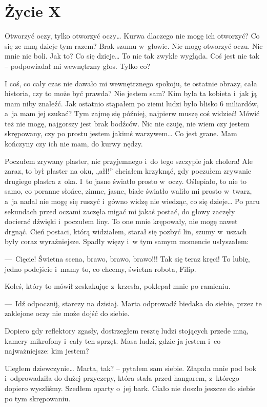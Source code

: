 \chapter{Życie X}

Otworzyć oczy, tylko otworzyć oczy… Kurwa dlaczego nie mogę ich otworzyć? Co się ze mną dzieje tym razem? Brak szumu w~głowie. Nie mogę otworzyć oczu. Nic mnie nie boli. Jak to? Co się dzieje… To nie tak zwykle wygląda. Coś jest nie tak – podpowiadał mi wewnętrzny głos. Tylko co?

I coś, co cały czas nie dawało mi wewnętrznego spokoju, te ostatnie obrazy, cała historia, czy to może być prawda? Nie jestem sam? Kim była ta kobieta i~jak ją mam niby znaleźć. Jak ostatnio stąpałem po ziemi ludzi było blisko 6 miliardów, a~ja mam jej szukać? Tym zajmę się później, najpierw muszę coś widzieć! Mówić też nie mogę, najgorszy jest brak bodźców. Nic nie czuję, nie wiem czy jestem skrępowany, czy po prostu jestem jakimś warzywem… Co jest grane. Mam kończyny czy ich nie mam, do kurwy nędzy.

Poczułem zrywany plaster, nic przyjemnego i~do tego szczypie jak cholera! Ale zaraz, to był plaster na oku, „ałł!” chciałem krzyknąć, gdy poczułem zrywanie drugiego plastra z~oka. I~to jasne światło prosto w~oczy. Oślepiało, to nie to samo, co poranne słońce, zimne, jasne, białe światło waliło mi prosto w~twarz, a~ja nadal nie mogę się ruszyć i~gówno widzę nie wiedząc, co się dzieje… Po paru sekundach przed oczami zaczęła migać mi jakaś postać, do głowy zaczęły docierać dźwięki i~poczułem liny. To one mnie krępowały, nie mogę nawet drgnąć. Cień postaci, którą widziałem, starał się pozbyć lin, szumy w~uszach były coraz wyraźniejsze. Spadły więzy i~w tym samym momencie usłyszałem:

---~Cięcie! Świetna scena, brawo, brawo, brawo!!! Tak się teraz kręci! To lubię, jedno podejście i~mamy to, co chcemy, świetna robota, Filip.

Koleś, który to mówił zeskakując z~krzesła, poklepał mnie po ramieniu.  

---~Idź odpocznij, starczy na dzisiaj. Marta odprowadź biedaka do siebie, przez te zaklejone oczy nie może dojść do siebie.

Dopiero gdy reflektory zgasły, dostrzegłem resztę ludzi stojących przede mną, kamery mikrofony i~cały ten sprzęt. Masa ludzi, gdzie ja jestem i~co najważniejsze: kim jestem?

Uległem dziewczynie… Marta, tak? – pytałem sam siebie. Złapała mnie pod bok i~odprowadziła do dużej przyczepy, która stała przed hangarem, z~którego dopiero wyszliśmy. Szedłem oparty o~jej bark. Ciało nie doszło jeszcze do siebie po tym skrępowaniu.

